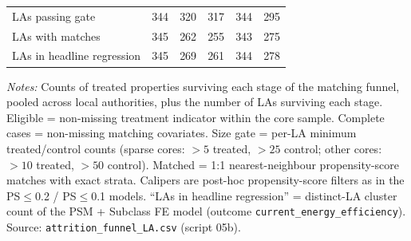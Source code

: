 \begin{table}[htbp]
\begin{tabular}{lrrrrr}
LAs passing gate & 344 & 320 & 317 & 344 & 295 \\
LAs with matches & 345 & 262 & 255 & 343 & 275 \\
LAs in headline regression & 345 & 269 & 261 & 344 & 278 \\
\bottomrule
\end{tabular}
\begin{minipage}{0.95\textwidth}
\vspace{4pt}
\footnotesize
\textit{Notes:} Counts of treated properties surviving each stage of the matching
funnel, pooled across local authorities, plus the number of LAs surviving each stage.
Eligible = non-missing treatment indicator within the core sample. Complete cases =
non-missing matching covariates. Size gate = per-LA minimum treated/control counts
(sparse cores: $>5$ treated, $>25$ control; other cores: $>10$ treated, $>50$ control).
Matched = 1:1 nearest-neighbour propensity-score matches with exact strata.
Calipers are post-hoc propensity-score filters as in the PS$\leq$0.2 / PS$\leq$0.1 models.
``LAs in headline regression'' = distinct-LA cluster count of the PSM + Subclass FE model
(outcome \texttt{current\_energy\_efficiency}).
Source: \texttt{attrition\_funnel\_LA.csv} (script 05b).
\end{minipage}
\end{table}
